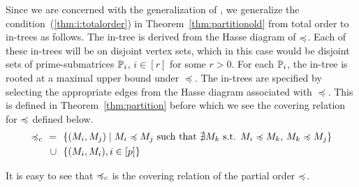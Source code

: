 

Since we are concerned with the generalization of \COP, we generalize
the condition~(\ref{thm:i:totalorder}) in
Theorem~\ref{thm:partitionold} from total order to in-trees as
follows.  The in-tree is derived from the Hasse diagram of
$\preccurlyeq$. Each of these in-trees will be on disjoint vertex sets,
which in this case would be disjoint sets of prime-submatrices
$\mathbb P_i$, $i \in [r]$ for some $r > 0$.  For each $\mathbb P_i$, the in-tree
is rooted at a maximal upper bound under $\preccurlyeq$.  The in-trees
are specified by selecting the appropriate edges from the Hasse
diagram associated with $\preccurlyeq$. This is defined in
Theorem~\ref{thm:partition} before which we see the covering relation
for $\preccurlyeq$ defined below.
\begin{align*}
  \primeless_c \ \  = \ \ &\{ (M_i,M_j) \mid M_i \primeless M_j \text{ \stt\ } \nexists
  M_k \text{ s.t. } M_i \primeless M_k \text{, } M_k \primeless M_j \} \\
  \cup \ \ &\{ (M_i,M_i), i \in [p] \}
\end{align*}

It is easy to see that $\preccurlyeq_c$ is the covering relation of the partial
order $\preccurlyeq$.

